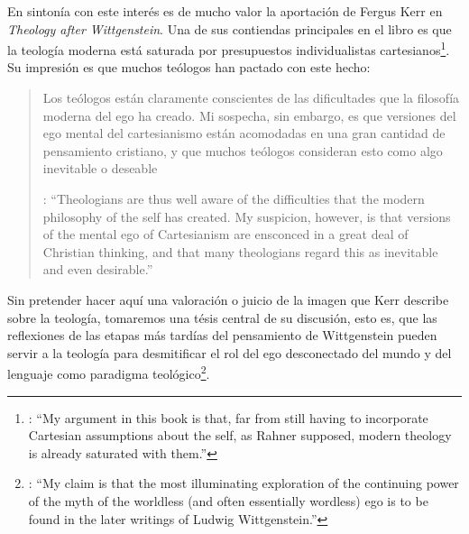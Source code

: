 En sintonía con este interés es de mucho valor la aportación de Fergus Kerr en \emph{Theology after Wittgenstein}. Una de sus contiendas principales en el libro es que la teología moderna está saturada por presupuestos individualistas cartesianos\footnote{\cite[Cf.~][8]{kerr1997theo}: \enquote{My argument in this book is that, far from still having to incorporate Cartesian assumptions about the self, as Rahner supposed, modern theology is already saturated with them.}}. Su impresión es que muchos teólogos han pactado con este hecho:\blockquote[{\cite[10]{kerr1997theo}}: \enquote{Theologians are thus well aware of the difficulties that the modern philosophy of the self has created. My suspicion, however, is that versions of the mental ego of Cartesianism are ensconced in a great deal of Christian thinking, and that many theologians regard this as inevitable and even desirable.}]{Los teólogos están claramente conscientes de las dificultades que la filosofía moderna del ego ha creado. Mi sospecha, sin embargo, es que versiones del ego mental del cartesianismo están acomodadas en una gran cantidad de pensamiento cristiano, y que muchos teólogos consideran esto como algo inevitable o deseable}. Sin pretender hacer aquí una valoración o juicio de la imagen que Kerr describe sobre la teología, tomaremos una tésis central de su discusión, esto es, que las reflexiones de las etapas más tardías del pensamiento de Wittgenstein pueden servir a la teología para desmitificar el rol del ego desconectado del mundo y del lenguaje como paradigma teológico\footnote{\cite[Cf.~][23]{kerr1997theo}: \enquote{My claim is that the most illuminating exploration of the continuing power of the myth of the worldless (and often essentially wordless) ego is to be found in the later writings of Ludwig Wittgenstein.}}.

